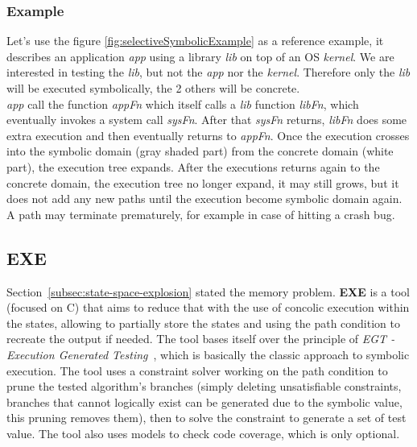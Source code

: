 \documentclass[11pt]{IEEEtran}
\begin{document}
    	\subsubsection{Example}
    	\label{subsec:S2EExample}
    		Let's use the figure \ref{fig:selectiveSymbolicExample} as a reference example, it describes an application \emph{app} using a library \emph{lib} on top of an OS \emph{kernel}. We are interested in testing the \emph{lib}, but not the \emph{app} nor the \emph{kernel}. Therefore only the \emph{lib} will be executed symbolically, the 2 others will be concrete.\\

    		\emph{app} call the function \emph{appFn} which itself calls a \emph{lib} function \emph{libFn}, which eventually invokes a system call \emph{sysFn}. After that \emph{sysFn} returns, \emph{libFn} does some extra execution and then eventually returns to \emph{appFn}. Once the execution crosses into the symbolic domain (gray shaded part) from the concrete domain (white part), the execution tree expands. After the executions returns again to the concrete domain, the execution tree no longer expand, it may still grows, but it does not add any new paths until the execution become symbolic domain again. A path may terminate prematurely, for example in case of hitting a crash bug.


    \subsection{EXE}
      \label{subsec:exe}
      Section~\ref{subsec:state-space-explosion} stated the memory problem. \textbf{EXE} is a tool (focused on C) that aims to reduce that with the use of concolic execution within the states, allowing to partially store the states and using the path condition to recreate the output if needed. The tool bases itself over the principle of \emph{EGT - Execution Generated Testing}~\cite{exe}, which is basically the classic approach to symbolic execution. The tool uses a constraint solver working on the path condition to prune the tested algorithm's branches (simply deleting unsatisfiable constraints, branches that cannot logically exist can be generated due to the symbolic value, this pruning removes them), then to solve the constraint to generate a set of test value. The tool also uses models to check code coverage, which is only optional.
\end{document}
